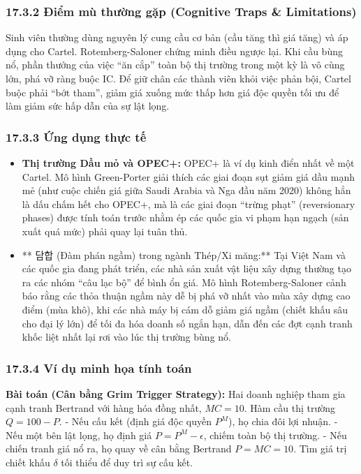 \documentclass[
]{article}
\providecommand{\tightlist}{%
  \setlength{\itemsep}{0pt}\setlength{\parskip}{0pt}}
\begin{document}
\subsubsection{17.3.2 Điểm mù thường gặp (Cognitive Traps \&
Limitations)}\label{ux111iux1ec3m-muxf9-thux1b0ux1eddng-gux1eb7p-cognitive-traps-limitations-122}

Sinh viên thường dùng nguyên lý cung cầu cơ bản (cầu tăng thì giá tăng)
và áp dụng cho Cartel. Rotemberg-Saloner chứng minh điều ngược lại. Khi
cầu bùng nổ, phần thưởng của việc ``ăn cắp'' toàn bộ thị trường trong
một kỳ là vô cùng lớn, phá vỡ ràng buộc IC. Để giữ chân các thành viên
khỏi việc phản bội, Cartel buộc phải ``bớt tham'', giảm giá xuống mức
thấp hơn giá độc quyền tối ưu để làm giảm sức hấp dẫn của sự lật lọng.

\subsubsection{17.3.3 Ứng dụng thực
tế}\label{ux1ee9ng-dux1ee5ng-thux1ef1c-tux1ebf-9}

\begin{itemize}
\tightlist
\item
  \textbf{Thị trường Dầu mỏ và OPEC+:} OPEC+ là ví dụ kinh điển nhất về
  một Cartel. Mô hình Green-Porter giải thích các giai đoạn sụt giảm giá
  dầu mạnh mẻ (như cuộc chiến giá giữa Saudi Arabia và Nga đầu năm 2020)
  không hẳn là dấu chấm hết cho OPEC+, mà là các giai đoạn ``trừng
  phạt'' (reversionary phases) được tính toán trước nhằm ép các quốc gia
  vi phạm hạn ngạch (sản xuất quá mức) phải quay lại tuân thủ.
\item
  ** 담합 (Đàm phán ngầm) trong ngành Thép/Xi măng:** Tại Việt Nam và
  các quốc gia đang phát triển, các nhà sản xuất vật liệu xây dựng
  thường tạo ra các nhóm ``câu lạc bộ'' để bình ổn giá. Mô hình
  Rotemberg-Saloner cảnh báo rằng các thỏa thuận ngầm này dễ bị phá vỡ
  nhất vào mùa xây dựng cao điểm (mùa khô), khi các nhà máy bị cám dỗ
  giảm giá ngầm (chiết khấu sâu cho đại lý lớn) để tối đa hóa doanh số
  ngắn hạn, dẫn đến các đợt cạnh tranh khốc liệt nhất lại rơi vào lúc
  thị trường bùng nổ.
\end{itemize}

\subsubsection{17.3.4 Ví dụ minh họa tính
toán}\label{vuxed-dux1ee5-minh-hux1ecda-tuxednh-touxe1n-2}

\textbf{Bài toán (Cân bằng Grim Trigger Strategy):} Hai doanh nghiệp
tham gia cạnh tranh Bertrand với hàng hóa đồng nhất, \(MC = 10\). Hàm
cầu thị trường \(Q = 100 - P\). - Nếu cấu kết (định giá độc quyền
\(P^M\)), họ chia đôi lợi nhuận. - Nếu một bên lật lọng, họ định giá
\(P = P^M - \epsilon\), chiếm toàn bộ thị trường. - Nếu chiến tranh giá
nổ ra, họ quay về cân bằng Bertrand \(P = MC = 10\). Tìm giá trị chiết
khấu \(\delta\) tối thiểu để duy trì sự cấu kết.
\end{document}
